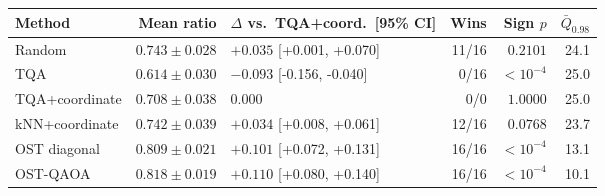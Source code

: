 \begin{tabular}{lrlrrr}
\toprule
Method & Mean ratio & $\Delta$ vs.\ TQA+coord.\ [95\% CI] & Wins & Sign $p$ & $\bar{Q}_{0.98}$ \\
\midrule
Random & $0.743\pm0.028$ & $+0.035$ [+0.001, +0.070] & 11/16 & $0.2101$ & 24.1 \\
TQA & $0.614\pm0.030$ & $-0.093$ [-0.156, -0.040] & 0/16 & $<10^{-4}$ & 25.0 \\
TQA+coordinate & $0.708\pm0.038$ & $0.000$ & 0/0 & $1.0000$ & 25.0 \\
kNN+coordinate & $0.742\pm0.039$ & $+0.034$ [+0.008, +0.061] & 12/16 & $0.0768$ & 23.7 \\
OST diagonal & $0.809\pm0.021$ & $+0.101$ [+0.072, +0.131] & 16/16 & $<10^{-4}$ & 13.1 \\
OST-QAOA & $0.818\pm0.019$ & $+0.110$ [+0.080, +0.140] & 16/16 & $<10^{-4}$ & 10.1 \\
\bottomrule
\end{tabular}
